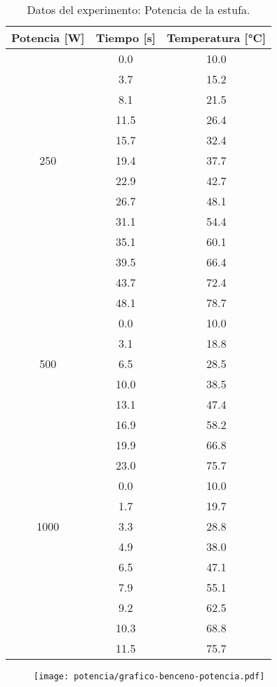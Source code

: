 \documentclass[a4paper, 12p]{article}
\begin{document}
\begin{table}[H]
      \centering
      \begin{tabular}{|c|c|c|}\hline
            Potencia [W]& Tiempo [s] & Temperatura [°C]\\ \hline
                        &   0.0    &10.0\\
                        & 3.7      &15.2\\
                        &8.1        &21.5\\
                        &11.5       &26.4\\
                        &15.7       &32.4\\
            250         &19.4       &37.7\\
                        &22.9        &42.7\\
                        &26.7        &48.1\\
                        &31.1         &54.4\\
                        &35.1         &60.1\\
                        &39.5         &66.4\\
                        &43.7        &72.4\\
                        &48.1        &78.7\\ \hline        
                        &0.0         &10.0\\
                        &3.1        &18.8\\
            500         &6.5        &28.5\\
                        &10.0       &38.5\\
                        &13.1       &47.4\\
                        &16.9       &58.2\\
                        &19.9       &66.8\\
                        &23.0       &75.7\\ \hline
                        &0.0        &10.0\\
                        &1.7        &19.7\\
            1000        &3.3        &28.8\\
                        &4.9        &38.0\\
                        &6.5         &47.1\\
                        &7.9        &55.1\\
                        &9.2         &62.5\\
                        &10.3       &68.8\\
                        &11.5       &75.7\\ \hline    
      \end{tabular}
      \label{tab: potencia}
      \caption[]{Datos del experimento: Potencia de la estufa.}
      
\end{table}
\begin{figure}[H]
      \centering
      \texttt{[image: potencia/grafico-benceno-potencia.pdf]}
      \label{img: potencia}
\end{figure}
\end{document}

